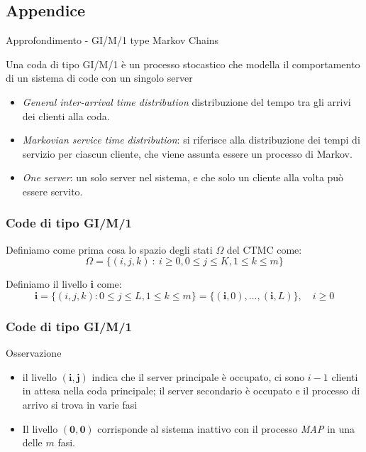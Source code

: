\documentclass{beamer}
\begin{document}
\subsection*{Appendice}


\begin{frame}{Approfondimento - GI/M/1 type Markov Chains}
    \begin{block}{}
        Una coda di tipo GI/M/1 è un processo stocastico che modella il comportamento di un sistema di code con un singolo server
    \end{block}
    \begin{itemize}
        \item [GI] \emph{General inter-arrival time distribution} distribuzione del tempo tra gli arrivi dei clienti alla coda.
        \item [M] \emph{Markovian service time distribution}: si riferisce alla distribuzione dei tempi di servizio per ciascun cliente, che viene assunta essere un processo di Markov.
        \item [1] \emph{One server}: un solo server nel sistema, e che solo un cliente alla volta può essere servito.
    \end{itemize}
\end{frame}


\begin{frame}
    \frametitle{Code di tipo GI/M/1}
    \begin{block}{}
            Definiamo come prima cosa lo spazio degli stati $\Omega$ del CTMC come:
            $$\Omega = \{ (i,j,k) ~ : ~ i \geq 0, 0 \leq j \leq K, 1 \leq k \leq m \}$$
    \end{block}
    Definiamo il livello \textbf{i} come:
    \begin{equation*}
        \textbf{i} = \{(i, j, k) : 0 \leq j \leq L, 1 \leq k \leq m\} = \{(\textbf{i}, 0), \dots, (\textbf{i}, L)\}, \quad i \geq 0
    \end{equation*}
\end{frame}


\begin{frame}
    \frametitle{Code di tipo GI/M/1}
    \begin{block}{Osservazione}
        \begin{itemize}
            \item il livello $(\textbf{i},\textbf{j})$ indica che il server principale è occupato, ci sono $i-1$ clienti in attesa nella coda principale; il server secondario è occupato e il processo di arrivo si trova in varie fasi
            \item  Il livello $(\textbf{0},\textbf{0})$ corrisponde al sistema inattivo con il processo \emph{MAP} in una delle $m$ fasi.
        \end{itemize}
    \end{block}
\end{frame}
\end{document}
